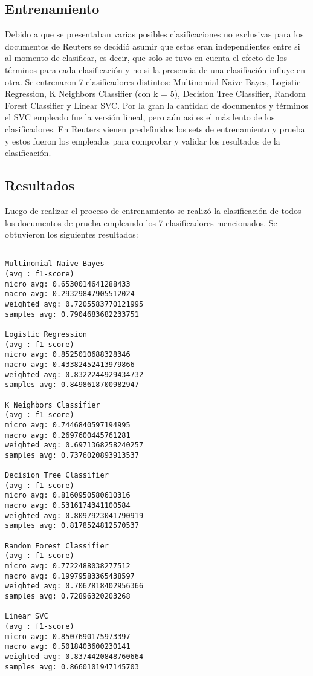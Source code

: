 \documentclass[12pt]{llncs}
\begin{document}
\subsection {Entrenamiento}

Debido a que se presentaban varias posibles clasificaciones no exclusivas para los documentos de Reuters se decidió asumir que estas eran independientes entre si al momento de clasificar, es decir, que solo se tuvo en cuenta el efecto de los términos para cada clasificación y no si la presencia de una clasifiación influye en otra. Se entrenaron 7 clasificadores distintos: Multinomial Naive Bayes, Logistic Regression, K Neighbors Classifier (con k = 5), Decision Tree Classifier, Random Forest Classifier y Linear SVC. Por la gran la cantidad de documentos y términos el SVC empleado fue la versión lineal, pero aún así es el más lento de los clasificadores. En Reuters vienen predefinidos los sets de entrenamiento y prueba y estos fueron los empleados para comprobar y validar los resultados de la clasificación. 

\subsection {Resultados}

Luego de realizar el proceso de entrenamiento se realizó la clasificación de todos los documentos de prueba empleando los 7 clasificadores mencionados. Se obtuvieron los siguientes resultados:

\begin{verbatim}

Multinomial Naive Bayes
(avg : f1-score)
micro avg: 0.6530014641288433
macro avg: 0.29329847905512024
weighted avg: 0.7205583770121995
samples avg: 0.7904683682233751

Logistic Regression
(avg : f1-score)
micro avg: 0.8525010688328346
macro avg: 0.43382452413979866
weighted avg: 0.8322244929434732
samples avg: 0.8498618700982947

K Neighbors Classifier
(avg : f1-score)
micro avg: 0.7446840597194995
macro avg: 0.2697600445761281
weighted avg: 0.6971368258240257
samples avg: 0.7376020893913537

Decision Tree Classifier
(avg : f1-score)
micro avg: 0.8160950580610316
macro avg: 0.5316174341100584
weighted avg: 0.8097923041790919
samples avg: 0.8178524812570537

Random Forest Classifier
(avg : f1-score)
micro avg: 0.7722488038277512
macro avg: 0.19979583365438597
weighted avg: 0.7067818402956366
samples avg: 0.72896320203268

Linear SVC
(avg : f1-score)
micro avg: 0.8507690175973397
macro avg: 0.5018403600230141
weighted avg: 0.8374420848760664
samples avg: 0.8660101947145703

\end{verbatim}
\end{document}
